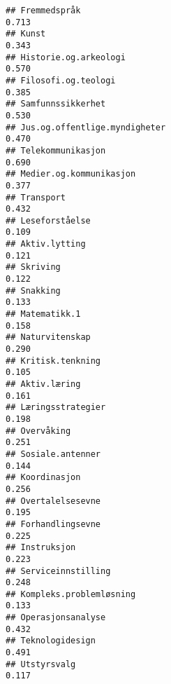 \documentclass[
]{article}
\begin{document}
\begin{verbatim}
## Fremmedspråk                                                                     0.713
## Kunst                                                                            0.343
## Historie.og.arkeologi                                                            0.570
## Filosofi.og.teologi                                                              0.385
## Samfunnssikkerhet                                                                0.530
## Jus.og.offentlige.myndigheter                                                    0.470
## Telekommunikasjon                                                                0.690
## Medier.og.kommunikasjon                                                          0.377
## Transport                                                                        0.432
## Leseforståelse                                                                   0.109
## Aktiv.lytting                                                                    0.121
## Skriving                                                                         0.122
## Snakking                                                                         0.133
## Matematikk.1                                                                     0.158
## Naturvitenskap                                                                   0.290
## Kritisk.tenkning                                                                 0.105
## Aktiv.læring                                                                     0.161
## Læringsstrategier                                                                0.198
## Overvåking                                                                       0.251
## Sosiale.antenner                                                                 0.144
## Koordinasjon                                                                     0.256
## Overtalelsesevne                                                                 0.195
## Forhandlingsevne                                                                 0.225
## Instruksjon                                                                      0.223
## Serviceinnstilling                                                               0.248
## Kompleks.problemløsning                                                          0.133
## Operasjonsanalyse                                                                0.432
## Teknologidesign                                                                  0.491
## Utstyrsvalg                                                                      0.117

\end{verbatim}
\end{document}

